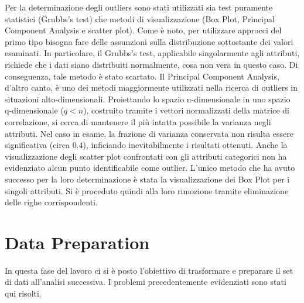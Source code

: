 \documentclass[a4paper,9pt]{article}
\begin{document}
Per la determinazione degli outliers sono stati utilizzati sia test puramente statistici (Grubbs's test) che metodi di visualizzazione (Box Plot, Principal Component Analysis e scatter plot). Come è noto, per utilizzare approcci del primo tipo bisogna fare delle assunzioni sulla distribuzione sottostante dei valori esaminati. In particolare, il Grubbs's test, applicabile singolarmente agli attributi, richiede che i dati siano distribuiti normalmente, cosa non vera in questo caso. Di conseguenza, tale metodo è stato scartato. 
Il Principal Component Analysis, d'altro canto, è uno dei metodi maggiormente utilizzati nella ricerca di outliers in situazioni alto-dimensionali. Proiettando lo spazio n-dimensionale in uno spazio q-dimensionale ($q<n$), costruito tramite i vettori normalizzati della matrice di correlazione, si cerca di mantenere il più intatta possibile la varianza negli attributi. Nel caso in esame, la frazione di varianza conservata non risulta essere significativa (circa $0.4$), inficiando inevitabilmente i risultati ottenuti.
Anche la visualizzazione degli scatter plot confrontati con gli attributi categorici non ha evidenziato alcun punto identificabile come outlier.
L'unico metodo che ha avuto successo per la loro determinazione è stata la visualizzazione dei Box Plot per i singoli attributi. Si è proceduto quindi alla loro rimozione tramite eliminazione delle righe corrispondenti.

\section{Data Preparation}
In questa fase del lavoro ci si è posto l'obiettivo di trasformare e preparare il set di dati all'analisi successiva. I problemi precedentemente evidenziati sono stati qui risolti.\\
\end{document}

